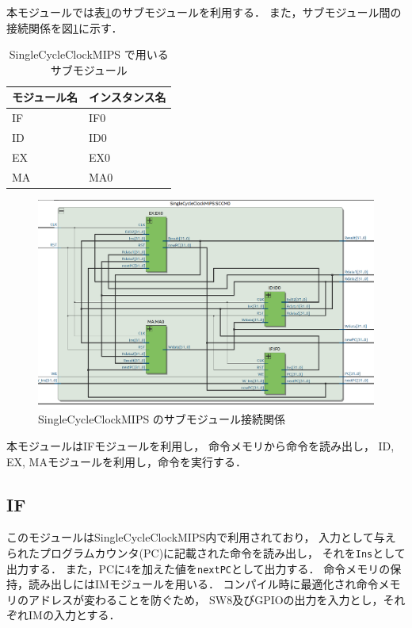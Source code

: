 本モジュールでは表\ref{tab:sccm_mod}のサブモジュールを利用する．
また，サブモジュール間の接続関係を図\ref{fig:sccm_mod}に示す．
\begin{table}[h]
  \caption{SingleCycleClockMIPS で用いるサブモジュール}
  \centering
  \begin{tabular}{l|l}
    モジュール名 & インスタンス名 \\
    \hline
    IF & IF0 \\
    ID & ID0 \\
    EX & EX0 \\
    MA & MA0 \\
  \end{tabular}
  \label{tab:sccm_mod}
\end{table}
\begin{figure}
  \centering
  \includegraphics[width=\textwidth]{sccm.png}
  \caption{SingleCycleClockMIPS のサブモジュール接続関係}
  \label{fig:sccm_mod}
\end{figure}

本モジュールはIFモジュールを利用し，
命令メモリから命令を読み出し，
ID, EX, MAモジュールを利用し，命令を実行する．

\subsection{IF}
このモジュールはSingleCycleClockMIPS内で利用されており，
入力として与えられたプログラムカウンタ(PC)に記載された命令を読み出し，
それを\texttt{Ins}として出力する．
また，PCに4を加えた値を\texttt{nextPC}として出力する．
命令メモリの保持，読み出しにはIMモジュールを用いる．
コンパイル時に最適化され命令メモリのアドレスが変わることを防ぐため，
SW8及びGPIOの出力を入力とし，それぞれIMの入力とする．

